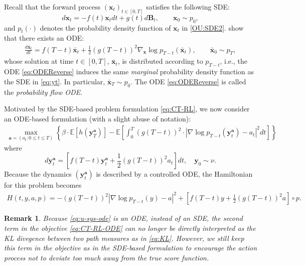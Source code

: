 \documentclass[11pt]{article}
\newtheorem{remark}{Remark}
\begin{document}
Recall that the forward process $(\mathbf{x}_{t})_{t \in [0, T]}$ satisfies the following SDE:
\begin{equation}\label{OU:SDE2}
d\mathbf{x}_{t}=-f(t)\mathbf{x}_{t}dt+g(t)d\mathbf{B}_{t},  \qquad {\mathbf{x}}_{0}\sim p_{0},
\end{equation}
and $p_{t}(\cdot)$ denotes the probability density function of $\mathbf{x}_t$ in \eqref{OU:SDE2}. \cite{SongICLR2021} show that there exists an ODE:
\begin{align}
\frac{d\bar{\mathbf{x}}_{t}}{dt}=f(T-t)\bar{\mathbf{x}}_{t}+ \frac{1}{2}(g(T-t))^{2}\nabla_{\mathbf{x}}\log p_{T-t}(\bar{\mathbf{x}}_{t}),
\qquad\bar{\mathbf{x}}_{0}\sim p_{T},\label{eq:ODEReverse}
\end{align}
whose solution  at time $t\in[0,T]$, $\bar{\mathbf{x}}_{t}$, is distributed according to $p_{T-t}$, i.e., the ODE \eqref{eq:ODEReverse} induces the same \textit{marginal} probability density function as the SDE in \eqref{eq:yt}.
In particular, $\bar{\mathbf{x}}_{T} \sim p_0.$
The ODE \eqref{eq:ODEReverse} is called the \textit{probability flow ODE}.



Motivated by the SDE-based problem formulation \eqref{eq:CT-RL}, we now consider an ODE-based formulation (with a slight abuse of notation):
\begin{align}\label{eq:CT-RL-ODE}
\max_{{\mathbf{a}} = (a_t: 0 \le t \le T)}  \left\{ \beta \cdot \mathbb{E}[h( \mathbf{y}^{\mathbf{a}}_{T})] -  \mathbb{E} \left[ \int_0^T (g(T-t))^{2} \cdot {| \nabla\log p_{T-t}({\mathbf{y}}^{\mathbf{a}}_{t}) - a_t|^2} dt \right]  \right\}
\end{align}
where
\begin{equation}\label{eq:u-sys-ode}
d\mathbf{y}^{\mathbf{a}}_{t}=\left[f(T-t)\mathbf{y}^{\mathbf{a}}_{t}+ \frac{1}{2}(g(T-t))^{2} a_t \right]dt, \quad \mathbf{y}_{0}\sim\nu.
\end{equation}
Because the dynamics $(\mathbf{y}^{\mathbf{a}}_{t})$ is described by a controlled ODE, the Hamiltonian for this problem becomes
\begin{align}\label{eq:Hal-ODE}
H(t, y, a, p) =   -(g(T-t))^{2}  | \nabla\log p_{T-t}(y) - a|^2  +  [f(T-t) y +  \frac{1}{2} (g(T-t))^{2} a ] \circ p. %
\end{align}

\begin{remark}\label{remark:ODE_KL}
Because \eqref{eq:u-sys-ode} is an ODE, instead of  an SDE, the second term in the objective \eqref{eq:CT-RL-ODE} can no longer be directly interpreted as the KL divegence between two path measures as in \eqref{eq:KL}. However, we still keep this term in the objective as in the SDE-based formulation to encourage the action process not to deviate too much away from the true score function.
\end{remark}
\end{document}
